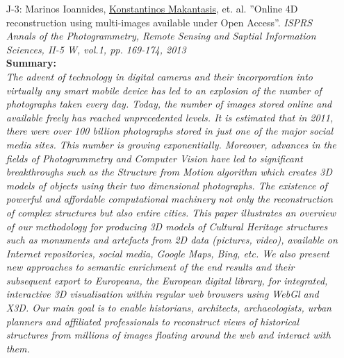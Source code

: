 \documentclass[a4paper,10pt]{article}
\begin{document}
\begin{itemize}
	\item [J-3:]Marinos Ioannides, \underline{Konstantinos Makantasis}, et. al. ''Online 4D reconstruction using multi-images available under Open Access''. \textit{ISPRS Annals of the Photogrammetry, Remote Sensing and Saptial Information Sciences, II-5 W, vol.1, pp. 169-174, 2013}\\
	\textbf{Summary:}\\
	\textit{The advent of technology in digital cameras and their incorporation into virtually any smart mobile device has led to an explosion of the number of photographs taken every day. Today, the number of images stored online and available freely has reached unprecedented levels. It is estimated that in 2011, there were over 100 billion photographs stored in just one of the major social media sites. This number is growing exponentially. Moreover, advances in the fields of Photogrammetry and Computer Vision have led to significant breakthroughs such as the Structure from Motion algorithm which creates 3D models of objects using their two dimensional photographs. The existence of powerful and affordable computational machinery not only the reconstruction of complex structures but also entire cities. This paper illustrates an overview of our methodology for producing 3D models of Cultural Heritage structures such as monuments and artefacts from 2D data (pictures, video), available on Internet repositories, social media, Google Maps, Bing, etc. We also present new approaches to semantic enrichment of the end results and their subsequent export to Europeana, the European digital library, for integrated, interactive 3D visualisation within regular web browsers using WebGl and X3D. Our main goal is to enable historians, architects, archaeologists, urban planners and affiliated professionals to reconstruct views of historical structures from millions of images floating around the web and interact with them.}
	

\end{itemize}
\end{document}
